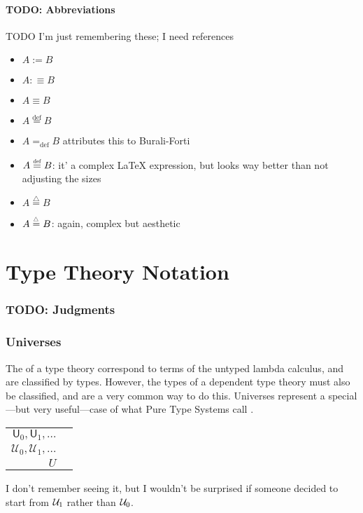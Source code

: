 \documentclass[11pt]{article} %
\theoremstyle{definition}
\theoremstyle{remark}
\begin{document}
\subsection{TODO: Abbreviations}

TODO I'm just remembering these; I need references

\begin{itemize}
  \item $A \mathbin{:=} B$
  \item $A \mathbin{:\equiv} B$
  \item $A \mathbin{\equiv} B$ \cite{martin-lof_1984}
  \item $A \stackrel{\mathrm{def}}= B$
  \item $A =_\mathrm{def} B$ \cite{martin-lof_1984} attributes this to Burali-Forti
  \item $A \mathrel{\overset{\mathclap{\scalebox{0.6}{\text{def}}}}{\scalebox{1.1}[1]=}} B$:
    it' a complex \LaTeX{} expression, but looks way better than not adjusting the sizes
  \item $A \stackrel{\triangle}= B$
  \item $A \mathrel{\overset{\scalebox{0.6}{$\triangle$}}=} B$:
    again, complex but aesthetic
\end{itemize}


\part{Type Theory Notation}

\section{TODO: Judgments}

\section{Universes}

The  of a type theory correspond to terms of the untyped lambda calculus, and are classified by types.
However, the types of a dependent type theory must also be classified, and  are a very common way to do this.
Universes represent a special---but very useful---case of what Pure Type Systems call .
\begin{center}
\renewcommand{\arraystretch}{1.2}
\begin{tabular}{rp{10cm}}
$\mathsf U_0, \mathsf U_1, \ldots$ & \\
$\mathcal U_0, \mathcal U_1, \ldots$ & \\
$U$ & \cite{martin-lof_1984} \\
\end{tabular}
\end{center}
I don't remember seeing it, but I wouldn't be surprised if someone decided to start from $\mathcal{U}_1$ rather than $\mathcal{U}_0$.
\end{document}
